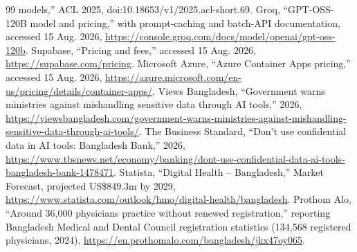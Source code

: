 \documentclass[12pt,twocolumn,a4paper]{article}
\begin{document}
\begin{thebibliography}{99}
models,'' ACL 2025, doi:10.18653/v1/2025.acl-short.69.
 Groq, ``GPT-OSS-120B model and pricing,'' with prompt-caching and batch-API
documentation, accessed 15 Aug. 2026,
\url{https://console.groq.com/docs/model/openai/gpt-oss-120b}.
 Supabase, ``Pricing and fees,'' accessed 15 Aug. 2026,
\url{https://supabase.com/pricing}.
 Microsoft Azure, ``Azure Container Apps pricing,'' accessed
15 Aug. 2026, \url{https://azure.microsoft.com/en-us/pricing/details/container-apps/}.
 Views Bangladesh, ``Government warns ministries against mishandling
sensitive data through AI tools,'' 2026,
\url{https://viewsbangladesh.com/government-warns-ministries-against-mishandling-sensitive-data-through-ai-tools/}.
 The Business Standard, ``Don't use confidential data in AI tools: Bangladesh
Bank,'' 2026,
\url{https://www.tbsnews.net/economy/banking/dont-use-confidential-data-ai-tools-bangladesh-bank-1478471}.
 Statista, ``Digital Health -- Bangladesh,'' Market Forecast, projected
US\$849.3m by 2029, \url{https://www.statista.com/outlook/hmo/digital-health/bangladesh}.
 Prothom Alo, ``Around 36,000 physicians practice without renewed
registration,'' reporting Bangladesh Medical and Dental Council registration statistics
(134,568 registered physicians, 2024), \url{https://en.prothomalo.com/bangladesh/jkx47oy065}.
\end{thebibliography}
\end{document}
